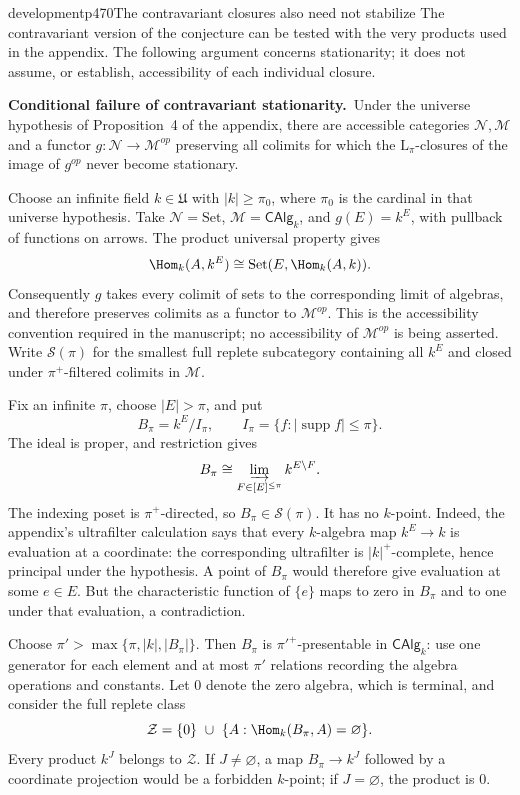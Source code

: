 \begin{dcomment}{development}{p470}{The contravariant closures also need not stabilize}
The contravariant version of the conjecture can be tested with the very products used in the appendix. The following argument concerns stationarity; it does not assume, or establish, accessibility of each individual closure.

\textbf{Conditional failure of contravariant stationarity.}\ours\
Under the universe hypothesis of Proposition~4 of the appendix, there are accessible categories $\mathcal N,\mathcal M$ and a functor $g:\mathcal N\to\mathcal M^{op}$ preserving all colimits for which the $\mathrm L_\pi$-closures of the image of $g^{op}$ never become stationary.

Choose an infinite field $k\in\mathfrak U$ with $|k|\ge\pi_0$, where $\pi_0$ is the cardinal in that universe hypothesis. Take $\mathcal N=\mathrm{Set}$, $\mathcal M=\mathsf{CAlg}_k$, and $g(E)=k^E$, with pullback of functions on arrows. The product universal property gives
\[
 \Hom_k(A,k^E)\cong\mathrm{Set}(E,\Hom_k(A,k)).
\]
Consequently $g$ takes every colimit of sets to the corresponding limit of algebras, and therefore preserves colimits as a functor to $\mathcal M^{op}$. This is the accessibility convention required in the manuscript; no accessibility of $\mathcal M^{op}$ is being asserted. Write $\mathcal S(\pi)$ for the smallest full replete subcategory containing all $k^E$ and closed under $\pi^+$-filtered colimits in $\mathcal M$.

Fix an infinite $\pi$, choose $|E|>\pi$, and put
\[
 B_\pi= k^E/I_\pi,
 \qquad I_\pi=\{f:|\operatorname{supp}f|\le\pi\}.
\]
The ideal is proper, and restriction gives
\[
 B_\pi\cong\varinjlim_{F\in[E]^{\le\pi}} k^{E\setminus F}.
\]
The indexing poset is $\pi^+$-directed, so $B_\pi\in\mathcal S(\pi)$. It has no $k$-point. Indeed, the appendix's ultrafilter calculation says that every $k$-algebra map $k^E\to k$ is evaluation at a coordinate: the corresponding ultrafilter is $|k|^+$-complete, hence principal under the hypothesis. A point of $B_\pi$ would therefore give evaluation at some $e\in E$. But the characteristic function of $\{e\}$ maps to zero in $B_\pi$ and to one under that evaluation, a contradiction.

Choose $\pi'>\max\{\pi,|k|,|B_\pi|\}$. Then $B_\pi$ is $\pi'^+$-presentable in $\mathsf{CAlg}_k$: use one generator for each element and at most $\pi'$ relations recording the algebra operations and constants. Let $0$ denote the zero algebra, which is terminal, and consider the full replete class
\[
 \mathcal Z=\{0\}\ \cup\
 \{A:\Hom_k(B_\pi,A)=\varnothing\}.
\]
Every product $k^J$ belongs to $\mathcal Z$. If $J\ne\varnothing$, a map $B_\pi\to k^J$ followed by a coordinate projection would be a forbidden $k$-point; if $J=\varnothing$, the product is $0$.


\end{dcomment}
